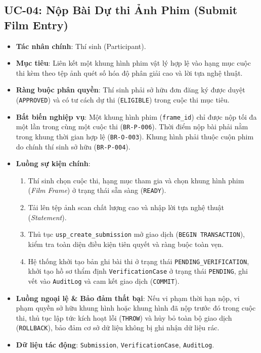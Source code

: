 \subsection{UC-04: Nộp Bài Dự thi Ảnh Phim (Submit Film Entry)}
\begin{itemize}
    \item \textbf{Tác nhân chính}: Thí sinh (Participant).
    \item \textbf{Mục tiêu}: Liên kết một khung hình phim vật lý hợp lệ vào hạng mục cuộc thi kèm theo tệp ảnh quét số hóa độ phân giải cao và lời tựa nghệ thuật.
    \item \textbf{Ràng buộc phân quyền}: Thí sinh phải sở hữu đơn đăng ký được duyệt (\texttt{APPROVED}) và có tư cách dự thi (\texttt{ELIGIBLE}) trong cuộc thi mục tiêu.
    \item \textbf{Bất biến nghiệp vụ}: Một khung hình phim (\texttt{frame\_id}) chỉ được nộp tối đa một lần trong cùng một cuộc thi (\texttt{BR-P-006}). Thời điểm nộp bài phải nằm trong khung thời gian hợp lệ (\texttt{BR-O-003}). Khung hình phải thuộc cuộn phim do chính thí sinh sở hữu (\texttt{BR-P-004}).
    \item \textbf{Luồng sự kiện chính}:
    \begin{enumerate}
        \item Thí sinh chọn cuộc thi, hạng mục tham gia và chọn khung hình phim (\textit{Film Frame}) ở trạng thái sẵn sàng (\texttt{READY}).
        \item Tải lên tệp ảnh scan chất lượng cao và nhập lời tựa nghệ thuật (\textit{Statement}).
        \item Thủ tục \texttt{usp\_create\_submission} mở giao dịch (\texttt{BEGIN TRANSACTION}), kiểm tra toàn diện điều kiện tiên quyết và ràng buộc toàn vẹn.
        \item Hệ thống khởi tạo bản ghi bài thi ở trạng thái \texttt{PENDING\_VERIFICATION}, khởi tạo hồ sơ thẩm định \texttt{VerificationCase} ở trạng thái \texttt{PENDING}, ghi vết vào \texttt{AuditLog} và cam kết giao dịch (\texttt{COMMIT}).
    \end{enumerate}
    \item \textbf{Luồng ngoại lệ \& Bảo đảm thất bại}: Nếu vi phạm thời hạn nộp, vi phạm quyền sở hữu khung hình hoặc khung hình đã nộp trước đó trong cuộc thi, thủ tục lập tức kích hoạt lỗi (\texttt{THROW}) và hủy bỏ toàn bộ giao dịch (\texttt{ROLLBACK}), bảo đảm cơ sở dữ liệu không bị ghi nhận dữ liệu rác.
    \item \textbf{Dữ liệu tác động}: \texttt{Submission}, \texttt{VerificationCase}, \texttt{AuditLog}.
\end{itemize}

